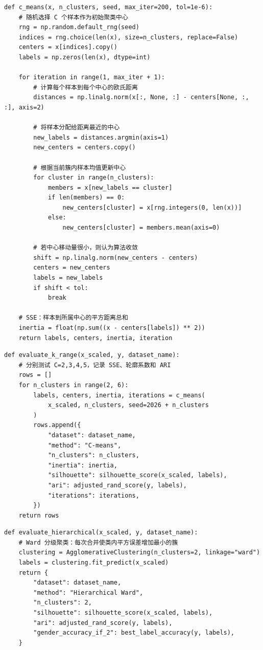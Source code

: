 \documentclass[UTF8,a4paper,12pt]{ctexart}
\begin{document}
\begin{lstlisting}[caption={Exp.5 C-means implementation},label={lst:exp5-cmeans}]
def c_means(x, n_clusters, seed, max_iter=200, tol=1e-6):
    # 随机选择 C 个样本作为初始聚类中心
    rng = np.random.default_rng(seed)
    indices = rng.choice(len(x), size=n_clusters, replace=False)
    centers = x[indices].copy()
    labels = np.zeros(len(x), dtype=int)

    for iteration in range(1, max_iter + 1):
        # 计算每个样本到每个中心的欧氏距离
        distances = np.linalg.norm(x[:, None, :] - centers[None, :, :], axis=2)

        # 将样本分配给距离最近的中心
        new_labels = distances.argmin(axis=1)
        new_centers = centers.copy()

        # 根据当前簇内样本均值更新中心
        for cluster in range(n_clusters):
            members = x[new_labels == cluster]
            if len(members) == 0:
                new_centers[cluster] = x[rng.integers(0, len(x))]
            else:
                new_centers[cluster] = members.mean(axis=0)

        # 若中心移动量很小，则认为算法收敛
        shift = np.linalg.norm(new_centers - centers)
        centers = new_centers
        labels = new_labels
        if shift < tol:
            break

    # SSE：样本到所属中心的平方距离总和
    inertia = float(np.sum((x - centers[labels]) ** 2))
    return labels, centers, inertia, iteration
\end{lstlisting}

\begin{lstlisting}[caption={Exp.5 cluster-number metrics},label={lst:exp5-k-range}]
def evaluate_k_range(x_scaled, y, dataset_name):
    # 分别测试 C=2,3,4,5，记录 SSE、轮廓系数和 ARI
    rows = []
    for n_clusters in range(2, 6):
        labels, centers, inertia, iterations = c_means(
            x_scaled, n_clusters, seed=2026 + n_clusters
        )
        rows.append({
            "dataset": dataset_name,
            "method": "C-means",
            "n_clusters": n_clusters,
            "inertia": inertia,
            "silhouette": silhouette_score(x_scaled, labels),
            "ari": adjusted_rand_score(y, labels),
            "iterations": iterations,
        })
    return rows
\end{lstlisting}

\begin{lstlisting}[caption={Exp.5 Ward hierarchical clustering},label={lst:exp5-ward}]
def evaluate_hierarchical(x_scaled, y, dataset_name):
    # Ward 分级聚类：每次合并使类内平方误差增加最小的簇
    clustering = AgglomerativeClustering(n_clusters=2, linkage="ward")
    labels = clustering.fit_predict(x_scaled)
    return {
        "dataset": dataset_name,
        "method": "Hierarchical Ward",
        "n_clusters": 2,
        "silhouette": silhouette_score(x_scaled, labels),
        "ari": adjusted_rand_score(y, labels),
        "gender_accuracy_if_2": best_label_accuracy(y, labels),
    }
\end{lstlisting}
\end{document}
